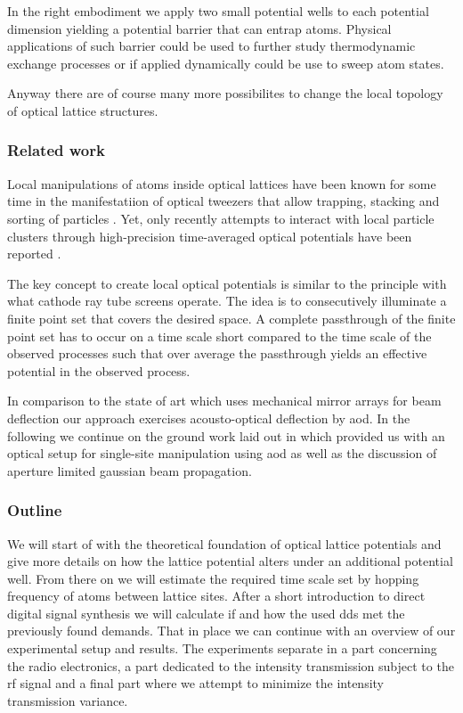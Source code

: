 In the right embodiment we apply two small potential wells to each potential
dimension yielding a potential barrier that can entrap atoms. Physical
applications of such barrier could be used to further study thermodynamic
exchange processes or if applied dynamically could be use to sweep atom
states.

Anyway there are of course many more possibilites to change the local
topology of optical lattice structures.

\subsubsection{Related work}

Local manipulations of atoms inside optical lattices have been known for some
time in the manifestatiion of optical tweezers that allow trapping, stacking
and sorting of particles \cite{Tadmor2004}. Yet, only recently attempts to
interact with local particle clusters through high-precision time-averaged
optical potentials have been reported \cite{Roy2016}.

The key concept to create local optical potentials is similar to the
principle with what cathode ray tube screens operate. The idea is to
consecutively illuminate a finite point set that covers the desired space.
A complete passthrough of the finite point set has to occur on a time scale
short compared to the time scale of the observed processes such that over
average the passthrough yields an effective potential in the observed
process.

In comparison to the state of art which uses mechanical mirror arrays for
beam deflection \cite{Roy2016} our approach exercises acousto-optical
deflection by \gls{aod}. In the following we continue on the ground work
laid out in \cite{Hertlein2017} which provided us with an optical setup for
single-site manipulation using \gls{aod} as well as the discussion of
aperture limited gaussian beam propagation.

\subsubsection{Outline}

We will start of with the theoretical foundation of optical lattice
potentials and give more details on how the lattice potential alters under
an additional potential well. From there on we will estimate the required
time scale set by hopping frequency of atoms between lattice sites. After
a short introduction to direct digital signal synthesis we will calculate
if and how the used \gls{dds} met the previously found demands. That in place
we can continue with an overview of our experimental setup and results. The
experiments separate in a part concerning the radio electronics, a part
dedicated to the intensity transmission subject to the \gls{rf} signal and
a final part where we attempt to minimize the intensity transmission
variance.

